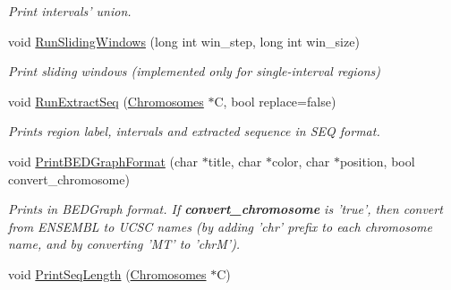 \begin{DoxyCompactItemize}
\begin{DoxyCompactList}\small\item\em Print intervals' union. \end{DoxyCompactList}\item 
\hypertarget{classGenomicRegionSet_aa326d5adcc97f47ed2de35353b60b393}{
void \hyperlink{classGenomicRegionSet_aa326d5adcc97f47ed2de35353b60b393}{RunSlidingWindows} (long int win\_\-step, long int win\_\-size)}
\label{classGenomicRegionSet_aa326d5adcc97f47ed2de35353b60b393}

\begin{DoxyCompactList}\small\item\em Print sliding windows (implemented only for single-\/interval regions) \end{DoxyCompactList}\item 
\hypertarget{classGenomicRegionSet_ab219b834c232c091982b066a2163f76a}{
void \hyperlink{classGenomicRegionSet_ab219b834c232c091982b066a2163f76a}{RunExtractSeq} (\hyperlink{classChromosomes}{Chromosomes} $\ast$C, bool replace=false)}
\label{classGenomicRegionSet_ab219b834c232c091982b066a2163f76a}

\begin{DoxyCompactList}\small\item\em Prints region label, intervals and extracted sequence in SEQ format. \end{DoxyCompactList}\item 
\hypertarget{classGenomicRegionSet_ade00553eb76b71f68e540739bdc776f4}{
void \hyperlink{classGenomicRegionSet_ade00553eb76b71f68e540739bdc776f4}{PrintBEDGraphFormat} (char $\ast$title, char $\ast$color, char $\ast$position, bool convert\_\-chromosome)}
\label{classGenomicRegionSet_ade00553eb76b71f68e540739bdc776f4}

\begin{DoxyCompactList}\small\item\em Prints in BEDGraph format. If {\bfseries convert\_\-chromosome} is 'true', then convert from ENSEMBL to UCSC names (by adding 'chr' prefix to each chromosome name, and by converting 'MT' to 'chrM'). \end{DoxyCompactList}\item 
\hypertarget{classGenomicRegionSet_a3da972129b9b69577bbe0bb9837bbea3}{
void \hyperlink{classGenomicRegionSet_a3da972129b9b69577bbe0bb9837bbea3}{PrintSeqLength} (\hyperlink{classChromosomes}{Chromosomes} $\ast$C)}
\label{classGenomicRegionSet_a3da972129b9b69577bbe0bb9837bbea3}


\end{DoxyCompactItemize}
